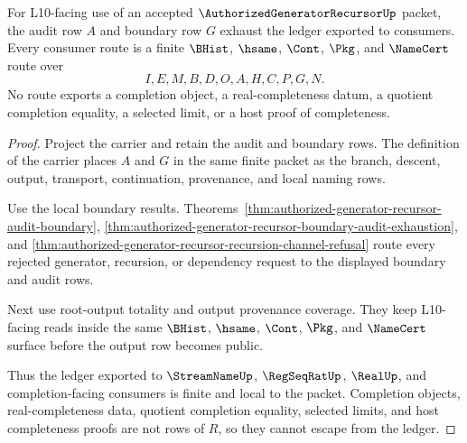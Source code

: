 \begin{theorem}
\label{thm:authorized-generator-recursor-open-phase-ledger-nonescape}
For L10-facing use of an accepted $\AuthorizedGeneratorRecursorUp$ packet, the audit row $A$ and boundary row $G$ exhaust the ledger exported to consumers. Every consumer route is a finite $\BHist$, $\hsame$, $\Cont$, $\Pkg$, and $\NameCert$ route over
$$
I,E,M,B,D,O,A,H,C,P,G,N.
$$
No route exports a completion object, a real-completeness datum, a quotient completion equality, a selected limit, or a host proof of completeness.
\end{theorem}
\begin{proof}
Project the carrier and retain the audit and boundary rows. The definition of the carrier places $A$ and $G$ in the same finite packet as the branch, descent, output, transport, continuation, provenance, and local naming rows.

Use the local boundary results. Theorems~\ref{thm:authorized-generator-recursor-audit-boundary}, \ref{thm:authorized-generator-recursor-boundary-audit-exhaustion}, and \ref{thm:authorized-generator-recursor-recursion-channel-refusal} route every rejected generator, recursion, or dependency request to the displayed boundary and audit rows.

Next use root-output totality and output provenance coverage. They keep L10-facing reads inside the same $\BHist$, $\hsame$, $\Cont$, $\Pkg$, and $\NameCert$ surface before the output row becomes public.

Thus the ledger exported to $\StreamNameUp$, $\RegSeqRatUp$, $\RealUp$, and completion-facing consumers is finite and local to the packet. Completion objects, real-completeness data, quotient completion equality, selected limits, and host completeness proofs are not rows of $R$, so they cannot escape from the ledger.
\end{proof}

